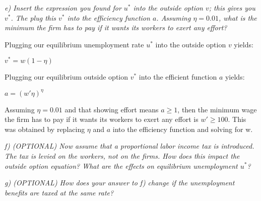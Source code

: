 \documentclass[11pt]{article} %
\begin{document}
\pagebreak
\textit{e) Insert the expression you found for $u^*$ into the outside option $v$; this
gives you $v^*$. The plug this $v^*$ into the efficiency function $a$. Assuming
$\eta=0.01$, what is the minimum the firm has to pay if it wants its
workers to exert any effort?}

\bigskip
Plugging our equilibrium unemployment rate $u^*$ into the outside option $v$ yields:
\begin{center}
$v^* = w(1 - \eta)$
\end{center}
Plugging our equilibrium outside option $v^*$ into the efficient function $a$ yields:
\begin{center}
$a = (w'\eta)^\eta$
\end{center}
Assuming $\eta = 0.01$ and that showing effort means $a ≥ 1$, then the minimum wage the firm has to pay if it wants its workers to exert any effort is $w' ≥ 100$. This was obtained by replacing $\eta$ and $a$ into the efficiency function and solving for w.

\pagebreak
\textit{f) (OPTIONAL) Now assume that a proportional labor income tax is
introduced. The tax is levied on the workers, not on the firms. How
does this impact the outside option equation? What are the effects on
equilibrium unemployment $u^*$?}




\pagebreak
\textit{g) (OPTIONAL) How does your answer to f) change if the unemployment
benefits are taxed at the same rate?}
\end{document}
